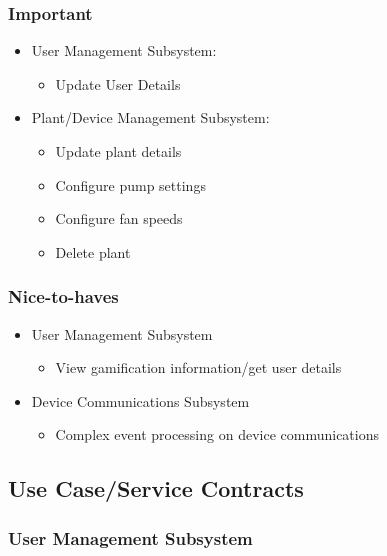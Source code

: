 \documentclass{article}
\begin{document}
		\subsubsection{Important}
			\begin{itemize}
				\item User Management Subsystem:
				\begin{itemize}
					\item Update User Details
				\end{itemize}
				
				\item Plant/Device Management Subsystem:
				\begin{itemize}
					\item Update plant details
					\item Configure pump settings
					\item Configure fan speeds
					\item Delete plant
				\end{itemize}
			\end{itemize}
			
		\subsubsection{Nice-to-haves}
			\begin{itemize}
				\item User Management Subsystem
					\begin{itemize}
						\item View gamification information/get user details
					\end{itemize}
				\item Device Communications Subsystem
					\begin{itemize}
						\item Complex event processing on device communications
					\end{itemize}
			\end{itemize}

\subsection{Use Case/Service Contracts}

\subsubsection{User Management Subsystem}
\end{document}
